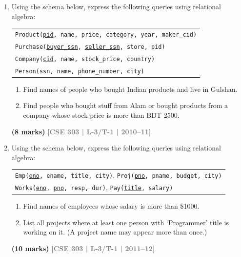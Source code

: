 \documentclass[12pt,a3paper]{article}
\newcommand{\yr}[1]{\hfill\textcolor{gray}{\small\textbf{[#1]}}}
\newcommand{\mk}[1]{\textcolor{orange!70!black}{\small\textbf{(#1 marks)}}}
\begin{document}
\begin{enumerate}

\item Using the schema below, express the following queries using relational algebra:
\begin{center}
\begin{tabular}{l}
\texttt{Product(\underline{pid}, name, price, category, year, maker\_cid)}\\
\texttt{Purchase(\underline{buyer\_ssn}, \underline{seller\_ssn}, store, pid)}\\
\texttt{Company(\underline{cid}, name, stock\_price, country)}\\
\texttt{Person(\underline{ssn}, name, phone\_number, city)}
\end{tabular}
\end{center}
\begin{enumerate}
  \item Find names of people who bought Indian products and live in Gulshan.
  \item Find people who bought stuff from Alam or bought products from a company whose stock price is more than BDT 2500.
\end{enumerate}
\mk{8} \yr{CSE 303 | L-3/T-1 | 2010--11}

\item Using the schema below, express the following queries using relational algebra:
\begin{center}
\begin{tabular}{l}
\texttt{Emp(\underline{eno}, ename, title, city)},\quad
\texttt{Proj(\underline{pno}, pname, budget, city)}\\
\texttt{Works(\underline{eno}, \underline{pno}, resp, dur)},\quad
\texttt{Pay(\underline{title}, salary)}
\end{tabular}
\end{center}
\begin{enumerate}
  \item Find names of employees whose salary is more than \$1000.
  \item List all projects where at least one person with `Programmer' title is working on it. (A project name may appear more than once.)
\end{enumerate}
\mk{10} \yr{CSE 303 | L-3/T-1 | 2011--12}


\end{enumerate}
\end{document}
